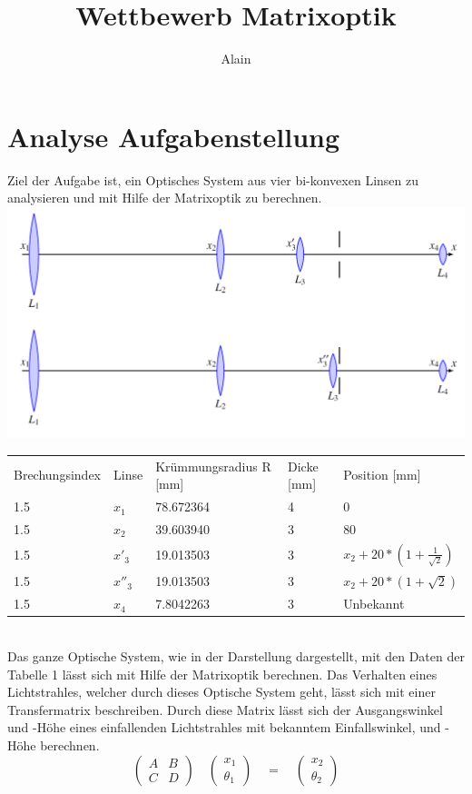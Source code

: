 \documentclass[11pt,twoside,a4paper]{article}
\title{Wettbewerb Matrixoptik}
\author{Alain}
\begin{document}
	\maketitle
	\section{Analyse Aufgabenstellung}
	Ziel der Aufgabe ist, ein Optisches System aus vier bi-konvexen Linsen zu analysieren und mit Hilfe der Matrixoptik zu berechnen. \\
	\includegraphics[scale=.25]{./system.PNG}
	\begin{table}
		\centering
		\begin{tabular}{lllll}
			Brechungsindex & Linse & Krümmungsradius R [mm]& Dicke [mm] & Position [mm] \\
			1.5 & \(x_{1}\) & 78.672364 & 4 & 0 \\
			1.5 & \(x_{2}\) & 39.603940 & 3 & 80 \\
			1.5 & \(x'_{3}\) & 19.013503 & 3 & \(x_{2} + 20 * (1+\frac{1}{\sqrt{2}})\)  \\
			1.5 & \(x''_{3}\) & 19.013503 & 3 & \(x_{2} + 20 * (1+\sqrt{2})\) \\
			1.5 & \(x_{4}\) & 7.8042263 & 3 & Unbekannt \\
		\end{tabular}
	\end{table} \\
	Das ganze Optische System, wie in der Darstellung dargestellt, mit den Daten der Tabelle 1 lässt sich mit Hilfe der Matrixoptik berechnen. Das Verhalten eines Lichtstrahles, welcher durch dieses Optische System geht, lässt sich mit einer Transfermatrix beschreiben. Durch diese Matrix lässt sich der Ausgangswinkel und -Höhe eines einfallenden Lichtstrahles mit bekanntem Einfallswinkel, und -Höhe berechnen.  
	\begin{equation} \label{Transfermatrix1}
	\begin{pmatrix}
	A & B \\
	C & D
	\end{pmatrix}
	\quad
	\begin{pmatrix}
	x_{1}\\
	\theta_{1}
	\end{pmatrix}
	\quad
	=
	\quad
	\begin{pmatrix}
	x_{2}\\
	\theta_{2}
	\end{pmatrix}
	\end{equation}
\end{document}
